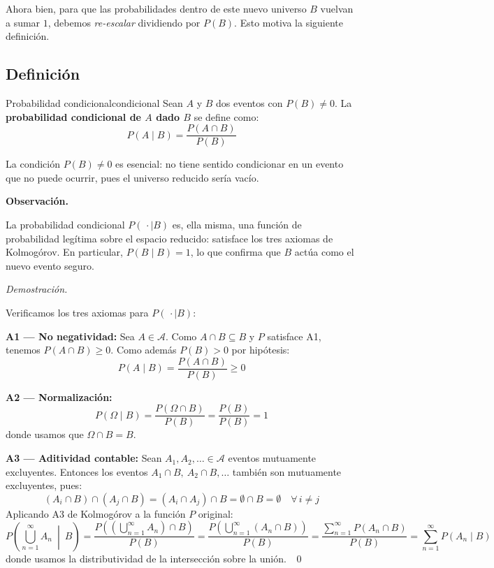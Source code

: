 \documentclass[12pt, a4paper]{book}
\newenvironment{observacion}{%
    \par\medskip\noindent\textbf{\color{azul}Observaci\'{o}n.}\enspace\itshape
}{\par\medskip}
\renewenvironment{proof}{%
    \par\medskip\noindent\textit{Demostraci\'{o}n.}\enspace
}{\qed\par\medskip}
\numberwithin{equation}{chapter}
\begin{document}
Ahora bien, para que las probabilidades dentro de este nuevo universo 
$B$ vuelvan a sumar $1$, debemos \textit{re-escalar} dividiendo por 
$P(B)$. Esto motiva la siguiente definición.

\subsection{Definición}

\begin{definicion}{Probabilidad condicional}{condicional}
	Sean $A$ y $B$ dos eventos con $P(B) \neq 0$. La \textbf{probabilidad 
		condicional de $A$ dado $B$} se define como:
	\[
	P(A \mid B) = \frac{P(A \cap B)}{P(B)}
	\]
\end{definicion}

La condición $P(B) \neq 0$ es esencial: no tiene sentido condicionar en 
un evento que no puede ocurrir, pues el universo reducido sería vacío.

\begin{observacion}
	La probabilidad condicional $P(\,\cdot \mid B)$ es, ella misma, una 
	función de probabilidad legítima sobre el espacio reducido: satisface 
	los tres axiomas de Kolmogórov. En particular, $P(B \mid B) = 1$, 
	lo que confirma que $B$ actúa como el nuevo evento seguro.
\end{observacion}

\begin{proof}
	Verificamos los tres axiomas para $P(\,\cdot \mid B)$:
	
	\medskip
	\noindent\textbf{A1 — No negatividad:} Sea $A \in \mathcal{A}$. 
	Como $A \cap B \subseteq B$ y $P$ satisface A1, tenemos 
	$P(A \cap B) \geq 0$. Como además $P(B) > 0$ por hipótesis:
	\[
	P(A \mid B) = \frac{P(A \cap B)}{P(B)} \geq 0
	\]
	
	\medskip
	\noindent\textbf{A2 — Normalización:} 
	\[
	P(\Omega \mid B) = \frac{P(\Omega \cap B)}{P(B)} = 
	\frac{P(B)}{P(B)} = 1
	\]
	donde usamos que $\Omega \cap B = B$.
	
	\medskip
	\noindent\textbf{A3 — Aditividad contable:} Sean 
	$A_1, A_2, \ldots \in \mathcal{A}$ eventos mutuamente excluyentes. 
	Entonces los eventos $A_1 \cap B,\ A_2 \cap B, \ldots$ también son 
	mutuamente excluyentes, pues:
	\[
	(A_i \cap B) \cap (A_j \cap B) = (A_i \cap A_j) \cap B = 
	\emptyset \cap B = \emptyset \quad \forall\, i \neq j
	\]
	Aplicando A3 de Kolmogórov a la función $P$ original:
	\[
	P\!\left(\bigcup_{n=1}^{\infty} A_n \ \middle|\ B\right) 
	= \frac{P\!\left(\left(\bigcup_{n=1}^{\infty} A_n\right) 
		\cap B\right)}{P(B)}
	= \frac{P\!\left(\bigcup_{n=1}^{\infty} (A_n \cap B)\right)}
	{P(B)}
	= \frac{\sum_{n=1}^{\infty} P(A_n \cap B)}{P(B)}
	= \sum_{n=1}^{\infty} P(A_n \mid B)
	\]
	donde usamos la distributividad de la intersección sobre la unión. 
	$\qedhere$
\end{proof}
\end{document}
